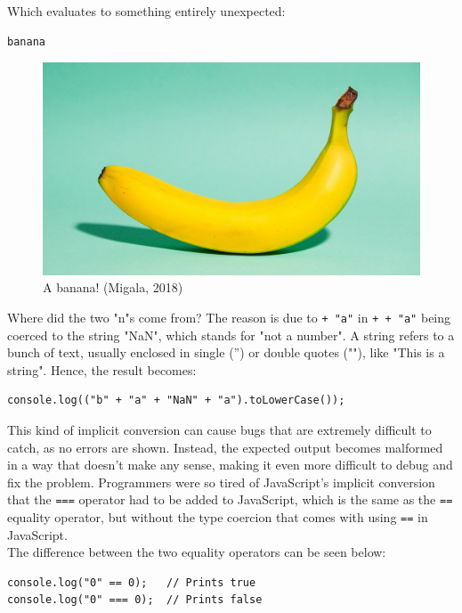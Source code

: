 \documentclass[11pt]{article}
\makeatletter
\newcommand{\citeprocitem}[2]{\hyper@linkstart{cite}{citeproc_bib_item_#1}#2\hyper@linkend}
\makeatother
\begin{document}
Which evaluates to something entirely unexpected:
\begin{verbatim}
banana
\end{verbatim}

\begin{figure}[htbp]
\centering
\includegraphics[scale=0.16]{./images/banana.jpg}
\caption{A banana! (\citeprocitem{22}{Migala, 2018})}
\end{figure}

 \newpage

Where did the two "n"s come from?
The reason is due to \texttt{+ "a"} in \texttt{+ + "a"}
being coerced to the string "NaN",
which stands for "not a number".
A string refers to a bunch of text,
usually enclosed in single ('') or
double quotes (""),
like "This is a string".
Hence, the result becomes:
\begin{verbatim}
console.log(("b" + "a" + "NaN" + "a").toLowerCase());
\end{verbatim}

This kind of implicit conversion can cause bugs that
are extremely difficult to catch, as no errors are shown.
Instead, the expected output becomes malformed in a way
that doesn't make any sense, making it even more difficult
to debug and fix the problem. Programmers were so tired
of JavaScript's implicit conversion that the \texttt{===} operator
had to be added to JavaScript, which is the same as the \texttt{==}
equality operator, but without the type coercion that comes
with using \texttt{==} in JavaScript.  \\

The difference between the two equality operators can be seen below:
\begin{verbatim}
console.log("0" == 0);   // Prints true
console.log("0" === 0);  // Prints false
\end{verbatim}
\end{document}
